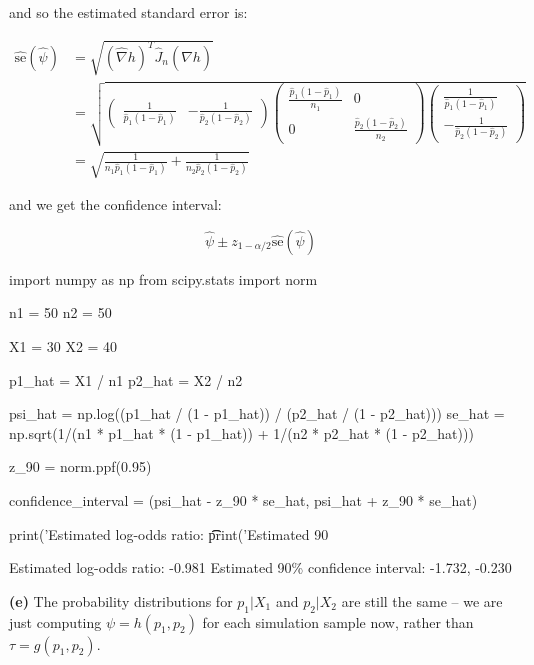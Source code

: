 and so the estimated standard error is:

\begin{align*}
\hat{\text{se}}(\hat{\psi}) &= \sqrt{(\hat{\nabla}h)^T \hat{J}_{n} (\hat{\nabla}h)} \\
&= 
\sqrt{\begin{pmatrix}
\frac{1}{\hat{p}_{1}(1 - \hat{p}_{1})} &
-\frac{1}{\hat{p}_{2}(1 - \hat{p}_{2})}
\end{pmatrix}
\begin{pmatrix}
\frac{\hat{p}_{1}(1 - \hat{p}_{1})}{n_{1}} & 0 \\
0 & \frac{\hat{p}_{2}(1 - \hat{p}_{2})}{n_{2}}
\end{pmatrix}
\begin{pmatrix}
\frac{1}{\hat{p}_{1}(1 - \hat{p}_{1})} \\
-\frac{1}{\hat{p}_{2}(1 - \hat{p}_{2})}
\end{pmatrix}} \\
&= \sqrt{\frac{1}{n_{1} \hat{p}_{1}(1 - \hat{p}_{1})} + \frac{1}{n_{2} \hat{p}_{2}(1 - \hat{p}_{2})}}
\end{align*}

and we get the confidence interval:

\[\hat{\psi} \pm z_{1 - \alpha/2} \hat{\text{se}}(\hat{\psi})\]

\begin{python}
import numpy as np
from scipy.stats import norm

n1 = 50
n2 = 50

X1 = 30
X2 = 40

p1_hat = X1 / n1
p2_hat = X2 / n2

psi_hat = np.log((p1_hat / (1 - p1_hat)) / (p2_hat / (1 - p2_hat)))
se_hat = np.sqrt(1/(n1 * p1_hat * (1 - p1_hat)) + 1/(n2 * p2_hat * (1 - p2_hat)))

z_90 = norm.ppf(0.95)

confidence_{i}nterval = (psi_hat - z_90 * se_hat, psi_hat + z_90 * se_hat)

print('Estimated log-odds ratio: \t\t %
print('Estimated 90%
\end{python}

\begin{console}
Estimated log-odds ratio:                -0.981
Estimated 90\% confidence interval:       -1.732, -0.230
\end{console}

\textbf{(e)} The probability distributions for \(p_{1} | X_{1}\) and
\(p_{2} | X_{2}\) are still the same -- we are just computing
\(\psi = h(p_{1}, p_{2})\) for each simulation sample now, rather than
\(\tau = g(p_{1}, p_{2})\).

